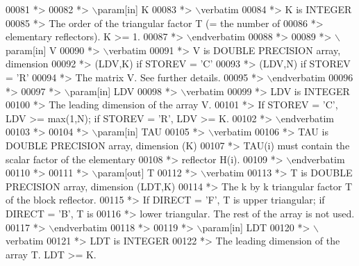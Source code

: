 \begin{DoxyCode}
00081 \textcolor{comment}{*>}
00082 \textcolor{comment}{*> \(\backslash\)param[in] K}
00083 \textcolor{comment}{*> \(\backslash\)verbatim}
00084 \textcolor{comment}{*>          K is INTEGER}
00085 \textcolor{comment}{*>          The order of the triangular factor T (= the number of}
00086 \textcolor{comment}{*>          elementary reflectors). K >= 1.}
00087 \textcolor{comment}{*> \(\backslash\)endverbatim}
00088 \textcolor{comment}{*>}
00089 \textcolor{comment}{*> \(\backslash\)param[in] V}
00090 \textcolor{comment}{*> \(\backslash\)verbatim}
00091 \textcolor{comment}{*>          V is DOUBLE PRECISION array, dimension}
00092 \textcolor{comment}{*>                               (LDV,K) if STOREV = 'C'}
00093 \textcolor{comment}{*>                               (LDV,N) if STOREV = 'R'}
00094 \textcolor{comment}{*>          The matrix V. See further details.}
00095 \textcolor{comment}{*> \(\backslash\)endverbatim}
00096 \textcolor{comment}{*>}
00097 \textcolor{comment}{*> \(\backslash\)param[in] LDV}
00098 \textcolor{comment}{*> \(\backslash\)verbatim}
00099 \textcolor{comment}{*>          LDV is INTEGER}
00100 \textcolor{comment}{*>          The leading dimension of the array V.}
00101 \textcolor{comment}{*>          If STOREV = 'C', LDV >= max(1,N); if STOREV = 'R', LDV >= K.}
00102 \textcolor{comment}{*> \(\backslash\)endverbatim}
00103 \textcolor{comment}{*>}
00104 \textcolor{comment}{*> \(\backslash\)param[in] TAU}
00105 \textcolor{comment}{*> \(\backslash\)verbatim}
00106 \textcolor{comment}{*>          TAU is DOUBLE PRECISION array, dimension (K)}
00107 \textcolor{comment}{*>          TAU(i) must contain the scalar factor of the elementary}
00108 \textcolor{comment}{*>          reflector H(i).}
00109 \textcolor{comment}{*> \(\backslash\)endverbatim}
00110 \textcolor{comment}{*>}
00111 \textcolor{comment}{*> \(\backslash\)param[out] T}
00112 \textcolor{comment}{*> \(\backslash\)verbatim}
00113 \textcolor{comment}{*>          T is DOUBLE PRECISION array, dimension (LDT,K)}
00114 \textcolor{comment}{*>          The k by k triangular factor T of the block reflector.}
00115 \textcolor{comment}{*>          If DIRECT = 'F', T is upper triangular; if DIRECT = 'B', T is}
00116 \textcolor{comment}{*>          lower triangular. The rest of the array is not used.}
00117 \textcolor{comment}{*> \(\backslash\)endverbatim}
00118 \textcolor{comment}{*>}
00119 \textcolor{comment}{*> \(\backslash\)param[in] LDT}
00120 \textcolor{comment}{*> \(\backslash\)verbatim}
00121 \textcolor{comment}{*>          LDT is INTEGER}
00122 \textcolor{comment}{*>          The leading dimension of the array T. LDT >= K.}

\end{DoxyCode}
